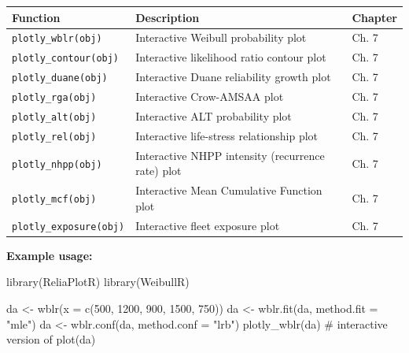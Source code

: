 \documentclass[
  letterpaper,
  DIV=11,
  numbers=noendperiod]{scrreprt}
\newenvironment{Shaded}{\begin{snugshade}}{\end{snugshade}}
\newcommand{\AttributeTok}[1]{\textcolor[rgb]{0.40,0.45,0.13}{#1}}
\newcommand{\CommentTok}[1]{\textcolor[rgb]{0.37,0.37,0.37}{#1}}
\newcommand{\DecValTok}[1]{\textcolor[rgb]{0.68,0.00,0.00}{#1}}
\newcommand{\FunctionTok}[1]{\textcolor[rgb]{0.28,0.35,0.67}{#1}}
\newcommand{\NormalTok}[1]{\textcolor[rgb]{0.00,0.23,0.31}{#1}}
\newcommand{\OtherTok}[1]{\textcolor[rgb]{0.00,0.23,0.31}{#1}}
\newcommand{\StringTok}[1]{\textcolor[rgb]{0.13,0.47,0.30}{#1}}
\newcounter{none} %
\begin{document}
{\def\LTcaptype{none} %
\begin{longtable}[]{@{}
  >{\raggedright\arraybackslash}p{}
  >{\raggedright\arraybackslash}p{}
  >{\raggedright\arraybackslash}p{}@{}}
\toprule\noalign{}
\begin{minipage}[b]{\linewidth}\raggedright
Function
\end{minipage} & \begin{minipage}[b]{\linewidth}\raggedright
Description
\end{minipage} & \begin{minipage}[b]{\linewidth}\raggedright
Chapter
\end{minipage} \\
\midrule\noalign{}
\endhead
\bottomrule\noalign{}
\endlastfoot
\texttt{plotly\_wblr(obj)} & Interactive Weibull probability plot & Ch.
7 \\
\texttt{plotly\_contour(obj)} & Interactive likelihood ratio contour
plot & Ch. 7 \\
\texttt{plotly\_duane(obj)} & Interactive Duane reliability growth plot
& Ch. 7 \\
\texttt{plotly\_rga(obj)} & Interactive Crow-AMSAA plot & Ch. 7 \\
\texttt{plotly\_alt(obj)} & Interactive ALT probability plot & Ch. 7 \\
\texttt{plotly\_rel(obj)} & Interactive life-stress relationship plot &
Ch. 7 \\
\texttt{plotly\_nhpp(obj)} & Interactive NHPP intensity (recurrence
rate) plot & Ch. 7 \\
\texttt{plotly\_mcf(obj)} & Interactive Mean Cumulative Function plot &
Ch. 7 \\
\texttt{plotly\_exposure(obj)} & Interactive fleet exposure plot & Ch.
7 \\
\end{longtable}
}

\textbf{Example usage:}

\begin{Shaded}
\begin{Highlighting}[]
\FunctionTok{library}\NormalTok{(ReliaPlotR)}
\FunctionTok{library}\NormalTok{(WeibullR)}

\NormalTok{da }\OtherTok{\textless{}{-}} \FunctionTok{wblr}\NormalTok{(}\AttributeTok{x =} \FunctionTok{c}\NormalTok{(}\DecValTok{500}\NormalTok{, }\DecValTok{1200}\NormalTok{, }\DecValTok{900}\NormalTok{, }\DecValTok{1500}\NormalTok{, }\DecValTok{750}\NormalTok{))}
\NormalTok{da }\OtherTok{\textless{}{-}} \FunctionTok{wblr.fit}\NormalTok{(da, }\AttributeTok{method.fit =} \StringTok{"mle"}\NormalTok{)}
\NormalTok{da }\OtherTok{\textless{}{-}} \FunctionTok{wblr.conf}\NormalTok{(da, }\AttributeTok{method.conf =} \StringTok{"lrb"}\NormalTok{)}
\FunctionTok{plotly\_wblr}\NormalTok{(da)   }\CommentTok{\# interactive version of plot(da)}
\end{Highlighting}
\end{Shaded}
\end{document}
